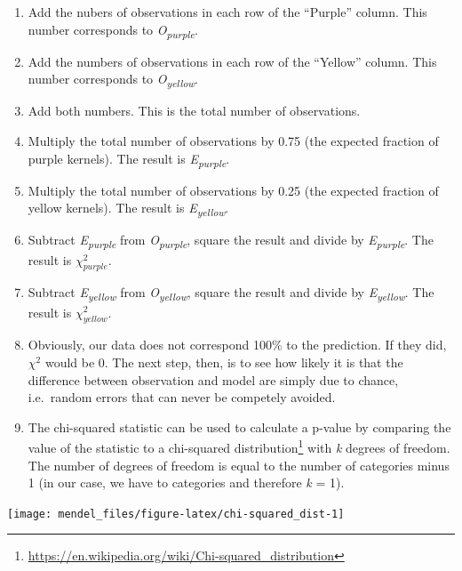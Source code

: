 \documentclass[]{book}
\providecommand{\tightlist}{%
  \setlength{\itemsep}{0pt}\setlength{\parskip}{0pt}}
\let\rmarkdownfootnote\footnote%
\def\footnote{\protect\rmarkdownfootnote}
\renewcommand{\href}[2]{#2\footnote{\url{#1}}}
\theoremstyle{definition}
\theoremstyle{definition}
\theoremstyle{definition}
\theoremstyle{remark}
\begin{document}
\begin{enumerate}
\def\labelenumi{\arabic{enumi}.}
\tightlist
\item
  Add the nubers of observations in each row of the ``Purple'' column.
  This number corresponds to \emph{O\textsubscript{purple}}.\\
\item
  Add the numbers of observations in each row of the ``Yellow'' column.
  This number corresponds to \emph{O\textsubscript{yellow}}.\\
\item
  Add both numbers. This is the total number of observations.
\item
  Multiply the total number of observations by 0.75 (the expected
  fraction of purple kernels). The result is
  \emph{E\textsubscript{purple}}.
\item
  Multiply the total number of observations by 0.25 (the expected
  fraction of yellow kernels). The result is
  \emph{E\textsubscript{yellow}}.
\item
  Subtract \emph{E\textsubscript{purple}} from
  \emph{O\textsubscript{purple}}, square the result and divide by
  \emph{E\textsubscript{purple}}. The result is \(\chi^2_{purple}\).
\item
  Subtract \emph{E\textsubscript{yellow}} from
  \emph{O\textsubscript{yellow}}, square the result and divide by
  \emph{E\textsubscript{yellow}}. The result is \(\chi^2_{yellow}\).
\item
  Obviously, our data does not correspond 100\% to the prediction. If
  they did, \(\chi^2\) would be 0. The next step, then, is to see how
  likely it is that the difference between observation and model are
  simply due to chance, i.e.~random errors that can never be competely
  avoided.
\item
  The chi-squared statistic can be used to calculate a p-value by
  comparing the value of the statistic to a
  \href{https://en.wikipedia.org/wiki/Chi-squared_distribution}{chi-squared
  distribution} with \emph{k} degrees of freedom. The number of degrees
  of freedom is equal to the number of categories minus 1 (in our case,
  we have to categories and therefore \emph{k} = 1).
\end{enumerate}

\begin{center}\texttt{[image: mendel\_files/figure-latex/chi-squared\_dist-1]} \end{center}
\end{document}
